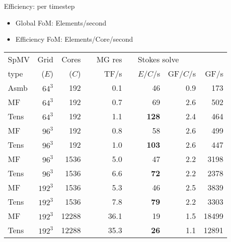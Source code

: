\documentclass{beamer}
\begin{document}
\begin{frame}{Efficiency: per timestep}
  \begin{itemize}
  \item Global FoM: Elements/second
  \item Efficiency FoM: Elements/Core/second
  \end{itemize}
    \begin{tabular}{lr r cr crrr}
    \toprule
    SpMV    &Grid  &Cores    &&{MG res}  &&\multicolumn{3}{l}{{Stokes solve}}      \\
    type         &($E$)    &($C$)        &&TF/s       & &$E$/$C$/s    &GF/$C$/s     &GF/s   \\
    \midrule
    Asmb    &$64^3$  &192     &&0.1       &&46 &0.9 &173          \\
    MF        &$64^3$  &192    &&0.7        &&69 &2.6 &502           \\
    Tens      &$64^3$  &192    &&1.1    &&{\bf 128} &2.4 &464          \\
    \midrule
    MF         &$96^3$   &192     &&0.8      &&58 &2.6 &499           \\
    Tens       &$96^3$  &192     &&1.0     &&{\bf 103} &2.6 &447  \\
    \midrule
    MF           &$96^3$   &1536      &&5.0    &&47 &2.2 &3198    \\
    Tens         &$96^3$   &1536     &&6.6   &&{\bf 72} &2.2 &2378   \\
    \midrule
    MF         &$192^3$   &1536    &&5.3   &&46 &2.5 &3839         \\
    Tens       &$192^3$  &1536     &&7.8   &&{\bf 79} &2.2 &3303   \\
    \midrule
    MF           &$192^3$  &12288  &&36.1   &&19  &1.5 &18499  \\
    Tens        &$192^3$  &12288  &&35.3   &&{\bf 26} &1.1 &12891  \\
    \bottomrule
  \end{tabular}
\end{frame}
\end{document}
